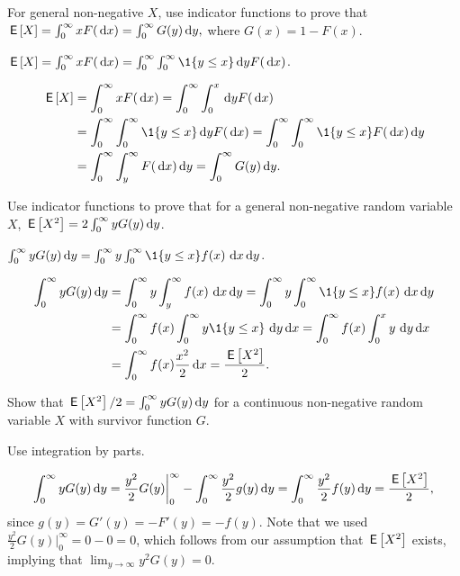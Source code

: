 \documentclass[queueing-book]{subfiles}
\begin{document}
\begin{exercise}\label{ex:l-107}
For  general non-negative $X$,  use indicator functions to prove that
$ \,\mathsf{E}\left[X\right] = \int_0^\infty x F(\,\textrm{d}x) = \int_0^\infty G(y) \,\textrm{d}y,$
where $G(x) = 1 - F(x)$.
\begin{hint}
$\E X = \int_0^\infty x F(\d x) = \int_0^\infty \int_0^\infty \1{y\leq x} \d y F(\d x)$.
\end{hint}
\begin{solution}
 \begin{align*}
 \E{X} &= \int_0^\infty x F(\d x) = \int_0^\infty \int_0^x \d y F(\d x) \\
 & = \int_0^\infty \int_0^\infty \1{y\leq x} \d y F(\d x) = \int_0^\infty \int_0^\infty \1{y\leq x} F(\d x) \d y\\
 & = \int_0^\infty \int_y^\infty F(\d x) \d y = \int_0^\infty G(y) \d y.
 \end{align*}
\end{solution}
\end{exercise}


\begin{exercise}
  Use indicator functions to prove that for a general non-negative random variable~$X$, $ \,\mathsf{E}\left[X^2\right] = 2 \int_0^\infty y G(y) \,\textrm{d}y$.
\begin{hint}
$\int_0^\infty y G(y) \d y = \int_0^\infty y \int_0^\infty \1{y\leq x}f(x)\, \d x \d y$.
\end{hint}
\begin{solution}
 \begin{align*}
\int_0^\infty y G(y) \d y
&= \int_0^\infty y \int_y^\infty f(x)\, \d x \d y = \int_0^\infty y \int_0^\infty \1{y\leq x}f(x)\, \d x \d y\\
&= \int_0^\infty f(x) \int_0^\infty y \1{y \leq x}\, \d y \d x
= \int_0^\infty f(x) \int_0^x y\, \d y \d x\\
&= \int_0^\infty f(x) \frac{x^2}2 \d x =\frac{\E{X^2}}2.
 \end{align*}
\end{solution}
\end{exercise}

\begin{exercise}\label{ex:l-108}
 Show that $\,\mathsf{E}\left[X^2\right]/2 = \int_0^\infty y G(y) \,\textrm{d}y$ for a continuous non-negative random variable $X$ with survivor function $G$.
 \begin{solution}
 \begin{hint}
 Use integration by parts.
 \end{hint}
 \begin{equation*}
 \int_0^\infty y G(y) \,\textrm{d}y
= \frac{y^2}2 G(y) \bigg|_0^\infty - \int_0^\infty \frac{y^2}2 g(y)\,\textrm{d}y = \int_0^\infty \frac{y^2}2 f(y)\,\textrm{d}y = \frac{\,\mathsf{E}\left[X^2\right]}2,
 \end{equation*}
 since $g(y) = G'(y) = - F'(y) = - f(y)$. Note that we used $\frac{y^2}2 G(y) \bigg|_0^\infty = 0 - 0 = 0$, which follows from our assumption that $\,\mathsf{E}\left[X^2\right]$ exists, implying that $\lim_{y \to \infty} y^2G(y) = 0$.
\end{solution}
\end{exercise}
\end{document}
